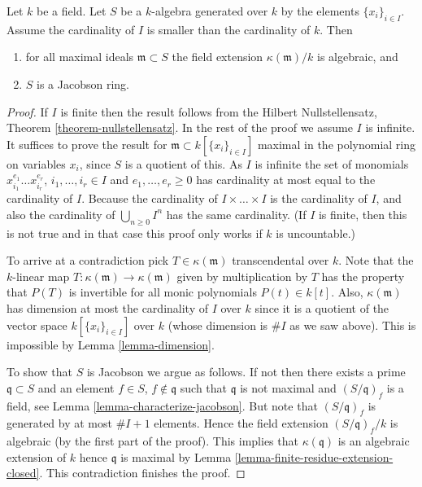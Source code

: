 \begin{theorem}
\label{theorem-uncountable-nullstellensatz}
Let $k$ be a field. Let $S$ be a $k$-algebra generated over $k$
by the elements $\{x_i\}_{i \in I}$. Assume the cardinality of $I$
is smaller than the cardinality of $k$. Then
\begin{enumerate}
\item for all maximal ideals $\mathfrak m \subset S$ the field
extension $\kappa(\mathfrak m)/k$
is algebraic, and
\item $S$ is a Jacobson ring.
\end{enumerate}
\end{theorem}

\begin{proof}
If $I$ is finite then the result follows from the Hilbert Nullstellensatz,
Theorem \ref{theorem-nullstellensatz}. In the rest of the proof we assume
$I$ is infinite. It suffices to prove the result for
$\mathfrak m \subset k[\{x_i\}_{i \in I}]$ maximal in the polynomial
ring on variables $x_i$, since $S$ is a quotient of this.
As $I$ is infinite the set
of monomials $x_{i_1}^{e_1} \ldots x_{i_r}^{e_r}$, $i_1, \ldots, i_r \in I$
and $e_1, \ldots, e_r \geq 0$ has cardinality at most equal to the
cardinality of $I$. Because the cardinality of $I \times \ldots \times I$
is the cardinality of $I$, and also the cardinality of
$\bigcup_{n \geq 0} I^n$ has the same cardinality.
(If $I$ is finite, then this is not true and
in that case this proof only works if $k$ is uncountable.)

\medskip\noindent
To arrive at a contradiction pick $T \in \kappa(\mathfrak m)$ transcendental
over $k$. Note that the $k$-linear map
$T : \kappa(\mathfrak m) \to \kappa(\mathfrak m)$
given by multiplication by $T$ has the property that $P(T)$ is invertible
for all monic polynomials $P(t) \in k[t]$.
Also, $\kappa(\mathfrak m)$ has dimension at most the cardinality of $I$
over $k$ since it is a quotient of the vector space
$k[\{x_i\}_{i \in I}]$ over $k$ (whose dimension is $\# I$ as we saw above).
This is impossible by Lemma \ref{lemma-dimension}.

\medskip\noindent
To show that $S$ is Jacobson we argue as follows. If not then
there exists a prime $\mathfrak q \subset S$ and an element $f \in S$,
$f \not \in \mathfrak q$ such that $\mathfrak q$ is not maximal
and $(S/\mathfrak q)_f$ is a field, see
Lemma \ref{lemma-characterize-jacobson}.
But note that $(S/\mathfrak q)_f$ is generated by at most $\# I + 1$ elements.
Hence the field extension $(S/\mathfrak q)_f/k$ is algebraic
(by the first part of the proof).
This implies that $\kappa(\mathfrak q)$ is an algebraic extension of $k$
hence $\mathfrak q$ is maximal by
Lemma \ref{lemma-finite-residue-extension-closed}. This contradiction
finishes the proof.
\end{proof}
